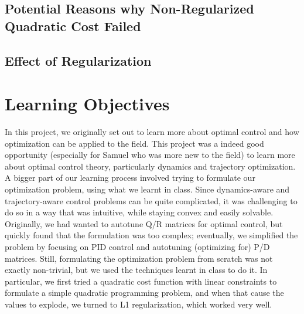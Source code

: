 \documentclass[11pt]{article}
\begin{document}
    \subsection{Potential Reasons why Non-Regularized Quadratic Cost Failed} \label{sec:discussion:failurecase}
    
    \subsection{Effect of Regularization} \label{sec:discussion:regularization}
    
    \section{Learning Objectives} \label{sec:learningobjectives}
    In this project, we originally set out to learn more about optimal control and how optimization can be applied to the field. 
    This project was a indeed good opportunity (especially for Samuel who was more new to the field) to learn more about optimal control theory, particularly dynamics and trajectory optimization. A bigger part of our learning process involved trying to formulate our optimization problem, using what we learnt in class. Since dynamics-aware and trajectory-aware control problems can be quite complicated, it was challenging to do so in a way that was intuitive, while staying convex and easily solvable. Originally, we had wanted to autotune Q/R matrices for optimal control, but quickly found that the formulation was too complex; eventually, we simplified the problem by focusing on PID control and autotuning (optimizing for) P/D matrices. Still, formulating the optimization problem from scratch was not exactly non-trivial, but we used the techniques learnt in class to do it. In particular, we first tried a quadratic cost function with linear constraints to formulate a simple quadratic programming problem, and when that cause the values to explode, we turned to L1 regularization, which worked very well. 
    
    
    
\end{document}
